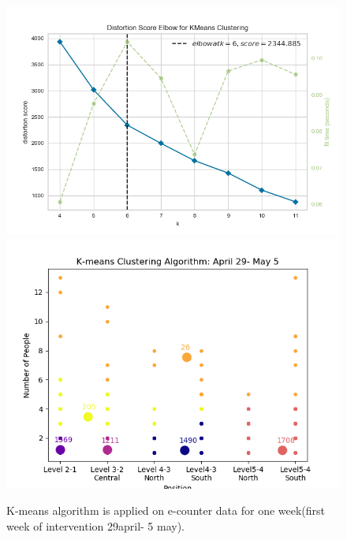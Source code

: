     
    
    
\begin{figure}[!h]
    \centering
    \includegraphics[width=.5\textwidth]{image/Chapters/Chapter6/elbow.png}%
    \includegraphics[width=.5\textwidth]{image/Chapters/Chapter6/kmeans1WeekDuring.png}%
    \caption{K-means algorithm is applied on e-counter data for one week(first week of intervention 29april- 5 may).}
    \label{elbkmean}
\end{figure}    



